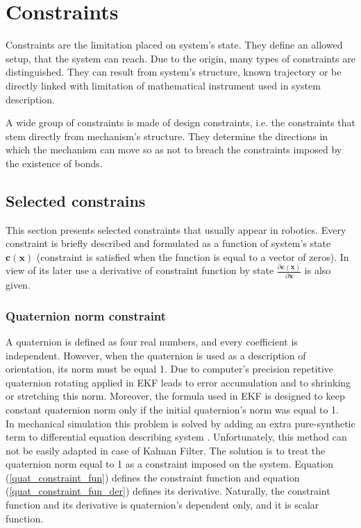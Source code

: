 \chapter{Constraints}

Constraints are the limitation placed on system's state. They define an allowed setup, that the system can reach. Due to the origin, many types of constraints are distinguished. They can result from system's structure, known trajectory or be directly linked with limitation of mathematical instrument used in system description.

A wide group of constraints is made of design constraints, i.e. the constraints that stem directly from mechanism's structure. They determine the directions in which the mechanism can move so as not to breach the constraints imposed by the existence of bonds.

\section{Selected constrains}

This section presents selected constraints that usually appear in robotics. Every constraint is briefly described and formulated as a function of system's state $\bm{c}(\bm{x})$ (constraint is satisfied when the function is equal to a vector of zeros). In view of its later use a derivative of constraint function by state $\frac{\partial \bm{c}(\bm{x})}{\partial \bm{x}}$ is also given.

\subsection{Quaternion norm constraint}

A quaternion is defined as four real numbers, and every coefficient is independent. However, when the quaternion is used as a description of orientation, its norm must be equal 1. Due to computer's precision repetitive quaternion rotating applied in EKF leads to error accumulation and to shrinking or stretching this norm. Moreover, the formula used in EKF is designed to keep constant quaternion norm only if the initial quaternion's norm was equal to 1.\\

In mechanical simulation this problem is solved by adding an extra pure-synthetic term to differential equation describing system \cite{quaternion}. Unfortunately, this method can not be easily adapted in case of Kalman Filter. The solution is to treat the quaternion norm equal to 1 as a constraint imposed on the system. Equation (\ref{quat_constraint_fun}) defines the constraint function and equation (\ref{quat_constraint_fun_der}) defines its derivative. Naturally, the constraint function and its derivative is quaternion's dependent only, and it is scalar function.


